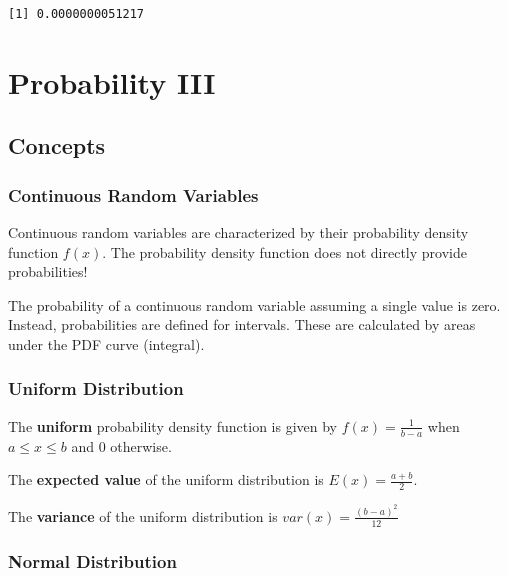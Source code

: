 \documentclass[
  letterpaper,
  DIV=11,
  numbers=noendperiod]{scrreprt}
\begin{document}
\begin{verbatim}
[1] 0.0000000051217
\end{verbatim}

\hypertarget{probability-iii}{%
\chapter{Probability III}\label{probability-iii}}

\hypertarget{concepts-9}{%
\section{Concepts}\label{concepts-9}}

\hypertarget{continuous-random-variables}{%
\subsection*{Continuous Random
Variables}\label{continuous-random-variables}}

Continuous random variables are characterized by their probability
density function \(f(x)\). The probability density function does not
directly provide probabilities!

The probability of a continuous random variable assuming a single value
is zero. Instead, probabilities are defined for intervals. These are
calculated by areas under the PDF curve (integral).

\hypertarget{uniform-distribution}{%
\subsection*{Uniform Distribution}\label{uniform-distribution}}

The \textbf{uniform} probability density function is given by
\(f(x)= \frac {1}{b-a}\) when \(a \leq x \leq b\) and \(0\) otherwise.

The \textbf{expected value} of the uniform distribution is
\(E(x)= \frac {a+b}{2}\).

The \textbf{variance} of the uniform distribution is
\(var(x)= \frac {(b-a)^2} {12}\)

\hypertarget{normal-distribution}{%
\subsection*{Normal Distribution}\label{normal-distribution}}
\end{document}
